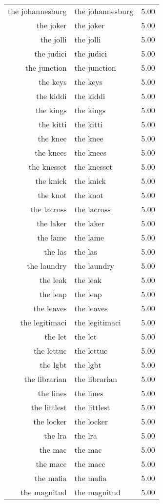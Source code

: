 \begin{table}[ht]
\begin{tabular}{rlr}
  the johannesburg & the johannesburg & 5.00 \\ 
  the joker & the joker & 5.00 \\ 
  the jolli & the jolli & 5.00 \\ 
  the judici & the judici & 5.00 \\ 
  the junction & the junction & 5.00 \\ 
  the keys & the keys & 5.00 \\ 
  the kiddi & the kiddi & 5.00 \\ 
  the kings & the kings & 5.00 \\ 
  the kitti & the kitti & 5.00 \\ 
  the knee & the knee & 5.00 \\ 
  the knees & the knees & 5.00 \\ 
  the knesset & the knesset & 5.00 \\ 
  the knick & the knick & 5.00 \\ 
  the knot & the knot & 5.00 \\ 
  the lacross & the lacross & 5.00 \\ 
  the laker & the laker & 5.00 \\ 
  the lame & the lame & 5.00 \\ 
  the las & the las & 5.00 \\ 
  the laundry & the laundry & 5.00 \\ 
  the leak & the leak & 5.00 \\ 
  the leap & the leap & 5.00 \\ 
  the leaves & the leaves & 5.00 \\ 
  the legitimaci & the legitimaci & 5.00 \\ 
  the let & the let & 5.00 \\ 
  the lettuc & the lettuc & 5.00 \\ 
  the lgbt & the lgbt & 5.00 \\ 
  the librarian & the librarian & 5.00 \\ 
  the lines & the lines & 5.00 \\ 
  the littlest & the littlest & 5.00 \\ 
  the locker & the locker & 5.00 \\ 
  the lra & the lra & 5.00 \\ 
  the mac & the mac & 5.00 \\ 
  the macc & the macc & 5.00 \\ 
  the mafia & the mafia & 5.00 \\ 
  the magnitud & the magnitud & 5.00 \\ 

\end{tabular}
\end{table}
